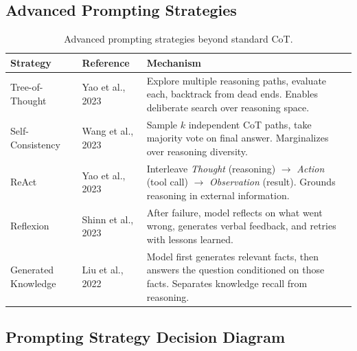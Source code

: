 \subsection{Advanced Prompting Strategies}

\begin{table}[H]
\centering
\small
\begin{tabularx}{\textwidth}{@{}l l X@{}}
\toprule
\textbf{Strategy} & \textbf{Reference} & \textbf{Mechanism} \\
\midrule
Tree-of-Thought & Yao et al., 2023
  & Explore multiple reasoning paths, evaluate each, backtrack from dead ends.
    Enables deliberate search over reasoning space. \\
Self-Consistency & Wang et al., 2023
  & Sample $k$ independent CoT paths, take majority vote on final answer.
    Marginalizes over reasoning diversity. \\
ReAct & Yao et al., 2023
  & Interleave \emph{Thought} (reasoning) $\to$ \emph{Action} (tool call)
    $\to$ \emph{Observation} (result).  Grounds reasoning in external
    information. \\
Reflexion & Shinn et al., 2023
  & After failure, model reflects on what went wrong, generates verbal
    feedback, and retries with lessons learned. \\
Generated Knowledge & Liu et al., 2022
  & Model first generates relevant facts, then answers the question
    conditioned on those facts.  Separates knowledge recall from reasoning. \\
\bottomrule
\end{tabularx}
\caption{Advanced prompting strategies beyond standard CoT.}
\label{tab:adv_prompting}
\end{table}

\subsection{Prompting Strategy Decision Diagram}


